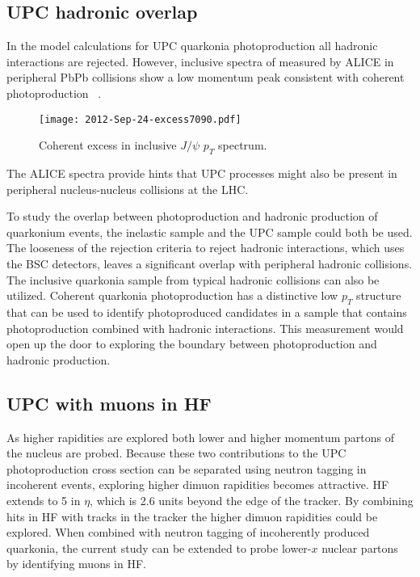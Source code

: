     \subsection{UPC hadronic overlap}
      In the model calculations for UPC quarkonia 
        photoproduction all hadronic interactions are rejected.
      However, inclusive \pt{} spectra of \JPsi{} measured by ALICE in 
        peripheral PbPb collisions show a low momentum peak consistent with 
        coherent photoproduction ~\cite{aliceIclJpsi}.
      \begin{figure}[h]
        \centering
        \texttt{[image: 2012-Sep-24-excess7090.pdf]}
        \caption{Coherent excess in inclusive $J/\psi$ $p_{T}$ spectrum.}
        \label{fig:alicePtSpecLowPt}
      \end{figure}
      The ALICE spectra provide hints that UPC processes might also be present 
        in peripheral nucleus-nucleus collisions at the LHC.
      
      To study the overlap between photoproduction and hadronic production of 
        quarkonium events, the inelastic sample and the UPC sample could both be
        used. 
      The looseness of the rejection criteria to reject hadronic interactions,
        which uses the BSC detectors, leaves a significant overlap with 
        peripheral hadronic collisions. 
      The inclusive quarkonia sample from typical hadronic collisions can also 
        be utilized. 
      Coherent quarkonia photoproduction has a distinctive low $p_{T}$ structure
        that can be used to identify photoproduced candidates in a sample that 
        contains photoproduction combined with hadronic interactions.
      This measurement would open up the door to exploring the boundary between
        photoproduction and hadronic production.

    \subsection{UPC \JPsi{} with muons in HF}
      As higher rapidities are explored both lower and higher momentum partons
        of the nucleus are probed. 
      Because these two contributions to the UPC photoproduction cross section 
        can be separated using neutron tagging in incoherent events, exploring
        higher dimuon rapidities becomes attractive.
      HF extends to 5 in $\eta$, which is 2.6 units beyond the edge of the 
        tracker.
      By combining hits in HF with tracks in the tracker the higher dimuon 
        rapidities could be explored. 
      When combined with neutron tagging of incoherently produced quarkonia,
        the current study can be extended to probe lower-$x$ nuclear partons 
        by identifying muons in HF. 

